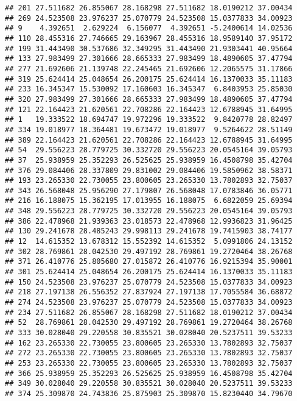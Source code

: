 \documentclass[
]{article}
\begin{document}
\begin{verbatim}
## 201 27.511682 26.855067 28.168298 27.511682 18.0190212 37.00434
## 269 24.523508 23.976237 25.070779 24.523508 15.0377833 34.00923
## 9    4.392651  2.629224  6.156077  4.392651 -5.2400614 14.02536
## 110 28.455316 27.746665 29.163967 28.455316 18.9589140 37.95172
## 199 31.443490 30.537686 32.349295 31.443490 21.9303441 40.95664
## 133 27.983499 27.301666 28.665333 27.983499 18.4890605 37.47794
## 277 21.692606 21.139748 22.245465 21.692606 12.2065575 31.17866
## 319 25.624414 25.048654 26.200175 25.624414 16.1370033 35.11183
## 233 16.345347 15.530092 17.160603 16.345347  6.8403953 25.85030
## 320 27.983499 27.301666 28.665333 27.983499 18.4890605 37.47794
## 121 22.164423 21.620561 22.708286 22.164423 12.6788945 31.64995
## 1   19.333522 18.694747 19.972296 19.333522  9.8420778 28.82497
## 334 19.018977 18.364481 19.673472 19.018977  9.5264622 28.51149
## 389 22.164423 21.620561 22.708286 22.164423 12.6788945 31.64995
## 54  29.556223 28.779725 30.332720 29.556223 20.0545164 39.05793
## 37  25.938959 25.352293 26.525625 25.938959 16.4508798 35.42704
## 376 29.084406 28.337809 29.831002 29.084406 19.5850962 38.58371
## 193 23.265330 22.730055 23.800605 23.265330 13.7802893 32.75037
## 343 26.568048 25.956290 27.179807 26.568048 17.0783846 36.05771
## 216 16.188075 15.362195 17.013955 16.188075  6.6822059 25.69394
## 348 29.556223 28.779725 30.332720 29.556223 20.0545164 39.05793
## 386 22.478968 21.939363 23.018573 22.478968 12.9936823 31.96425
## 130 29.241678 28.485243 29.998113 29.241678 19.7415903 38.74177
## 12  14.615352 13.678312 15.552392 14.615352  5.0991806 24.13152
## 302 28.769861 28.042530 29.497192 28.769861 19.2720464 38.26768
## 371 26.410776 25.805680 27.015872 26.410776 16.9215394 35.90001
## 301 25.624414 25.048654 26.200175 25.624414 16.1370033 35.11183
## 150 24.523508 23.976237 25.070779 24.523508 15.0377833 34.00923
## 218 27.197138 26.556352 27.837924 27.197138 17.7055584 36.68872
## 274 24.523508 23.976237 25.070779 24.523508 15.0377833 34.00923
## 234 27.511682 26.855067 28.168298 27.511682 18.0190212 37.00434
## 52  28.769861 28.042530 29.497192 28.769861 19.2720464 38.26768
## 333 30.028040 29.220558 30.835521 30.028040 20.5237511 39.53233
## 162 23.265330 22.730055 23.800605 23.265330 13.7802893 32.75037
## 272 23.265330 22.730055 23.800605 23.265330 13.7802893 32.75037
## 253 23.265330 22.730055 23.800605 23.265330 13.7802893 32.75037
## 366 25.938959 25.352293 26.525625 25.938959 16.4508798 35.42704
## 349 30.028040 29.220558 30.835521 30.028040 20.5237511 39.53233
## 374 25.309870 24.743836 25.875903 25.309870 15.8230440 34.79670

\end{verbatim}
\end{document}
